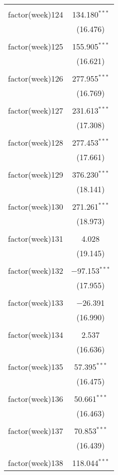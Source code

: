 \documentclass{article}
\begin{document}
\begin{table}[!htbp]
\begin{tabular}{@{\extracolsep{5pt}}lc}
  & \\ 
 factor(week)124 & 134.180$^{***}$ \\ 
  & (16.476) \\ 
  & \\ 
 factor(week)125 & 155.905$^{***}$ \\ 
  & (16.621) \\ 
  & \\ 
 factor(week)126 & 277.955$^{***}$ \\ 
  & (16.769) \\ 
  & \\ 
 factor(week)127 & 231.613$^{***}$ \\ 
  & (17.308) \\ 
  & \\ 
 factor(week)128 & 277.453$^{***}$ \\ 
  & (17.661) \\ 
  & \\ 
 factor(week)129 & 376.230$^{***}$ \\ 
  & (18.141) \\ 
  & \\ 
 factor(week)130 & 271.261$^{***}$ \\ 
  & (18.973) \\ 
  & \\ 
 factor(week)131 & 4.028 \\ 
  & (19.145) \\ 
  & \\ 
 factor(week)132 & $-$97.153$^{***}$ \\ 
  & (17.955) \\ 
  & \\ 
 factor(week)133 & $-$26.391 \\ 
  & (16.990) \\ 
  & \\ 
 factor(week)134 & 2.537 \\ 
  & (16.636) \\ 
  & \\ 
 factor(week)135 & 57.395$^{***}$ \\ 
  & (16.475) \\ 
  & \\ 
 factor(week)136 & 50.661$^{***}$ \\ 
  & (16.463) \\ 
  & \\ 
 factor(week)137 & 70.853$^{***}$ \\ 
  & (16.439) \\ 
  & \\ 
 factor(week)138 & 118.044$^{***}$ \\ 

\end{tabular}
\end{table}
\end{document}
